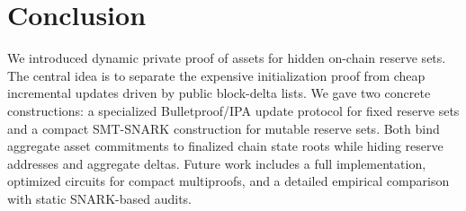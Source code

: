 \documentclass[runningheads]{llncs}
\begin{document}
\section{Conclusion}

We introduced dynamic private proof of assets for hidden on-chain reserve sets.  The central idea is to separate the expensive initialization proof from cheap incremental updates driven by public block-delta lists.  We gave two concrete constructions: a specialized Bulletproof/IPA update protocol for fixed reserve sets and a compact SMT-SNARK construction for mutable reserve sets.  Both bind aggregate asset commitments to finalized chain state roots while hiding reserve addresses and aggregate deltas.  Future work includes a full implementation, optimized circuits for compact multiproofs, and a detailed empirical comparison with static SNARK-based audits.
\end{document}
